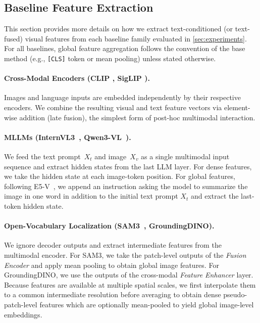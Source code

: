 \subsection{Baseline Feature Extraction}
\label{app:baseline_extraction}

This section provides more details on how we extract text-conditioned (or text-fused) visual features from each baseline family evaluated in \cref{sec:experiments}.
For all baselines, global feature aggregation follows the convention of the base method (e.g., \texttt{[CLS]} token or mean pooling) unless stated otherwise.

\paragraph{Cross-Modal Encoders (CLIP \cite{radford2021_clip}, SigLIP \cite{zhai2023_siglip}).}
Images and language inputs are embedded independently by their respective encoders.
We combine the resulting visual and text feature vectors via element-wise addition (late fusion), the simplest form of post-hoc multimodal interaction.

\paragraph{MLLMs (InternVL3~\cite{zhu2025internvl3}, Qwen3-VL~\cite{Qwen3-VL}).}
We feed the text prompt~$X_t$ and image~$X_v$ as a single multimodal input sequence and extract hidden states from the last LLM layer.
For dense features, we take the hidden state at each image-token position.
For global features, following E5-V~\cite{Jiang2024E5VUE}, we append an instruction asking the model to summarize the image in one word in addition to the initial text prompt $X_t$
and extract the last-token hidden state.

\paragraph{Open-Vocabulary Localization (SAM3~\cite{carion2025_sam3}, GroundingDINO\cite{liu2023groundingdino}).}
We ignore decoder outputs and extract intermediate features from the multimodal encoder.
For SAM3, we take the patch-level outputs of the \textit{Fusion Encoder} and apply mean pooling to obtain global image features.
For GroundingDINO, we use the outputs of the cross-modal \textit{Feature Enhancer} layer.
Because features are available at multiple spatial scales, we first interpolate them to a common intermediate resolution before averaging to obtain dense pseudo-patch-level features which are optionally mean-pooled to yield global image-level embeddings.


